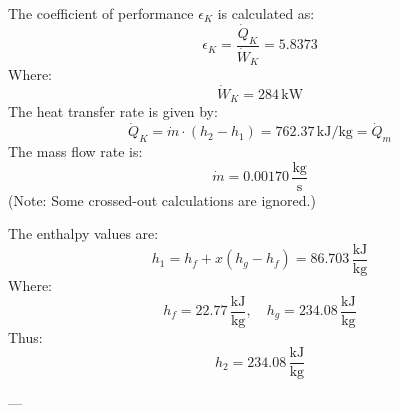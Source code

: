 The coefficient of performance \( \epsilon_K \) is calculated as:  
\[
\epsilon_K = \frac{\dot{Q}_K}{\dot{W}_K} = 5.8373
\]  
Where:  
\[
\dot{W}_K = 284 \, \text{kW}
\]  
The heat transfer rate is given by:  
\[
\dot{Q}_K = \dot{m} \cdot (h_2 - h_1) = 762.37 \, \text{kJ/kg} = \dot{Q}_m
\]  
The mass flow rate is:  
\[
\dot{m} = 0.00170 \, \frac{\text{kg}}{\text{s}}
\]  
(Note: Some crossed-out calculations are ignored.)  

The enthalpy values are:  
\[
h_1 = h_f + x(h_g - h_f) = 86.703 \, \frac{\text{kJ}}{\text{kg}}
\]  
Where:  
\[
h_f = 22.77 \, \frac{\text{kJ}}{\text{kg}}, \quad h_g = 234.08 \, \frac{\text{kJ}}{\text{kg}}
\]  
Thus:  
\[
h_2 = 234.08 \, \frac{\text{kJ}}{\text{kg}}
\]

---